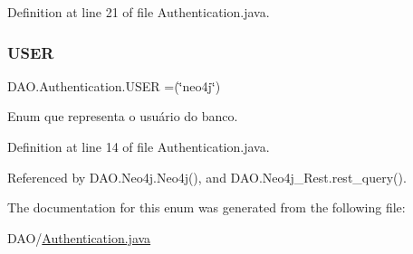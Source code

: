 Definition at line 21 of file Authentication.\+java.

\hypertarget{enumDAO_1_1Authentication_a5f441343b3dc00f97af7f7317e6cde41}{}\label{enumDAO_1_1Authentication_a5f441343b3dc00f97af7f7317e6cde41} 
\subsubsection{\texorpdfstring{U\+S\+ER}{USER}}
{\footnotesize\ttfamily D\+A\+O.\+Authentication.\+U\+S\+ER =(\char`\"{}neo4j\char`\"{})}

Enum que representa o usuário do banco. 

Definition at line 14 of file Authentication.\+java.



Referenced by D\+A\+O.\+Neo4j.\+Neo4j(), and D\+A\+O.\+Neo4j\+\_\+\+Rest.\+rest\+\_\+query().



The documentation for this enum was generated from the following file\+:\begin{DoxyCompactItemize}
\item 
D\+A\+O/\hyperlink{Authentication_8java}{Authentication.\+java}\end{DoxyCompactItemize}

